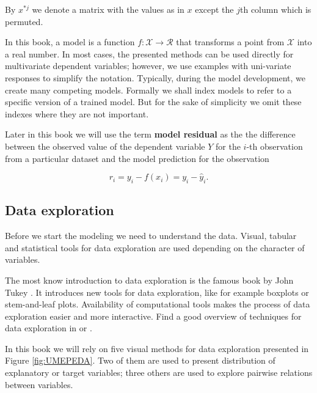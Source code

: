 \documentclass[12pt,]{krantz}
\begin{document}
By \(x^{*j}\) we denote a matrix with the values as in \(x\) except the \(j\)th column which is permuted.

In this book, a model is a function \(f:\mathcal X \rightarrow \mathcal R\) that transforms a point from \(\mathcal X\) into a real number. In most cases, the presented methods can be used directly for multivariate dependent variables; however, we use examples with uni-variate responses to simplify the notation.
Typically, during the model development, we create many competing models. Formally we shall index models to refer to a specific version of a trained model. But for the sake of simplicity we omit these indexes where they are not important.

Later in this book we will use the term \textbf{model residual} as the the difference between the observed value of the dependent variable \(Y\) for the \(i\)-th observation from a particular dataset and the model prediction for the observation

\begin{equation}
r_i = y_i - f(x_i) = y_i - \hat y_i.
\label{eq:modelResiduals}
\end{equation}

\hypertarget{data-exploration}{%
\subsection{Data exploration}\label{data-exploration}}

Before we start the modeling we need to understand the data.
Visual, tabular and statistical tools for data exploration are used depending on the character of variables.

The most know introduction to data exploration is the famous book by John Tukey \citep{tukey1977}. It introduces new tools for data exploration, like for example boxplots or stem-and-leaf plots. Availability of computational tools makes the process of data exploration easier and more interactive. Find a good overview of techniques for data exploration in \citep{Nolan2015} or \citep{Wickham2017}.

In this book we will rely on five visual methods for data exploration presented in Figure \ref{fig:UMEPEDA}. Two of them are used to present distribution of explanatory or target variables; three others are used to explore pairwise relations between variables.
\end{document}
